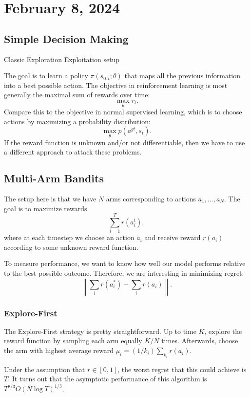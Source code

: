 \section{February 8, 2024}

\subsection{Simple Decision Making}

Classic Exploration Exploitation setup 

The goal is to learn a policy $\pi(s_{0:t};\theta)$ that maps all the previous information into a best possible action. The objective in reinforcement learning is most generally the maximal sum of rewards over time: 
\[\max_{\theta}r_t.\] 
Compare this to the objective in normal supervised learning, which is to choose actions by maximizing a probability distribution: 
\[\max_{\theta}p(a^{gt}, s_t).\] 
If the reward function is unknown and/or not differentiable, then we have to use a different approach to attack these problems. 

\subsection{Multi-Arm Bandits}

The setup here is that we have $N$ arms corresponding to actions $a_1, \hdots, a_N$. The goal is to maximize rewards 
\[\sum_{i=1}^T r(a_i^t),\] 
where at each timestep we choose an action $a_i$ and receive reward $r(a_i)$ according to some unknown reward function. 

To measure performance, we want to know how well our model performs relative to the best possible outcome. Therefore, we are interesting in minimizing \ac{regret}: 
\[\left\lVert \sum_i r(a_i^*) - \sum_i r(a_i)\right\rVert.\] 

\subsubsection{Explore-First}

The Explore-First strategy is pretty straightforward. Up to time $K$, explore the reward function by sampling each arm equally $K/N$ times. Afterwards, choose the arm with highest average reward $\mu_i = (1/k_i)\sum_{k_i}r(a_i)$. 

Under the assumption that $r\in [0,1]$, the worst regret that this could achieve is $T$. It turns out that the asymptotic performance of this algorithm is $T^{2/3}O(N\log T)^{1/3}$. 


